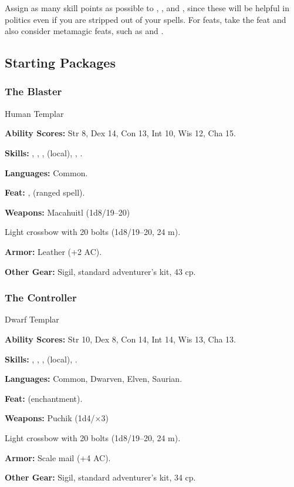 Assign as many skill points as possible to , , and , since these will be helpful in politics even if you are stripped out of your spells. For feats, take the  feat and also consider metamagic feats, such as  and .


\subsection{Starting Packages}
\subsubsection{The Blaster}
Human Templar

\textbf{Ability Scores:} Str 8, Dex 14, Con 13, Int 10, Wis 12, Cha 15.

\textbf{Skills:} , , ,  (local), , .

\textbf{Languages:} Common.

\textbf{Feat:} ,  (ranged spell).

\textbf{Weapons:} Macahuitl (1d8/19--20)

Light crossbow with 20 bolts (1d8/19--20, 24 m).

\textbf{Armor:} Leather (+2 AC).

\textbf{Other Gear:} Sigil, standard adventurer's kit, 43 cp.

\subsubsection{The Controller}
Dwarf Templar

\textbf{Ability Scores:} Str 10, Dex 8, Con 14, Int 14, Wis 13, Cha 13.

\textbf{Skills:} , , ,  (local), .

\textbf{Languages:} Common, Dwarven, Elven, Saurian.

\textbf{Feat:}  (enchantment).

\textbf{Weapons:} Puchik (1d4/$\times$3)

Light crossbow with 20 bolts (1d8/19--20, 24 m).

\textbf{Armor:} Scale mail (+4 AC).

\textbf{Other Gear:} Sigil, standard adventurer's kit, 34 cp.

